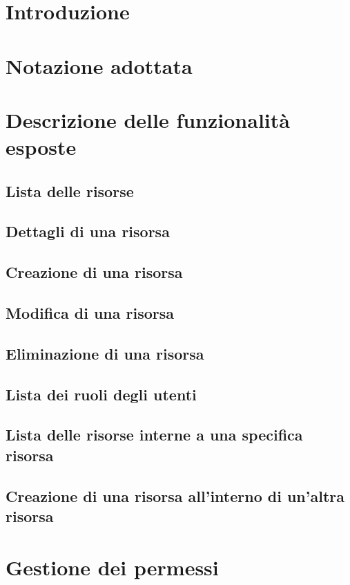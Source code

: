 \section{Introduzione}

\section{Notazione adottata}

\section{Descrizione delle funzionalità esposte}

\subsection{Lista delle risorse} \label{api:lista}

\subsection{Dettagli di una risorsa} \label{api:dettaglio}

\subsection{Creazione di una risorsa} \label{api:creazione}

\subsection{Modifica di una risorsa} \label{api:modifica}

\subsection{Eliminazione di una risorsa} \label{api:eliminazione}

\subsection{Lista dei ruoli degli utenti} \label{api:utenti-lista-ruoli}

\subsection{Lista delle risorse interne a una specifica risorsa} \label{api:lista-risorsa}

\subsection{Creazione di una risorsa all'interno di un'altra risorsa} \label{api:creazione-risorsa}

\section{Gestione dei permessi}
